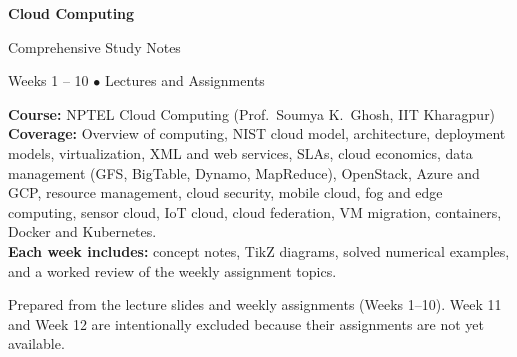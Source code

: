\documentclass[11pt,a4paper,openany]{report}
\begin{document}
\begin{titlepage}
\thispagestyle{empty}
\vspace*{1.5cm}
\begin{tcolorbox}[colback=navy,colframe=slate,boxrule=3pt,arc=3mm,
  left=10mm,right=10mm,top=14mm,bottom=14mm]
{\color{white}\Huge\bfseries Cloud Computing\par}
\vspace{0.5cm}
{\color{white}\LARGE Comprehensive Study Notes\par}
\vspace{0.5cm}
{\color{white}\large Weeks 1 -- 10 \quad $\bullet$ \quad Lectures and Assignments\par}
\end{tcolorbox}
\vspace{3cm}
\begin{tcolorbox}[colback=paleblue,colframe=navy,arc=2mm]
\textbf{Course:} NPTEL Cloud Computing (Prof.\ Soumya K.\ Ghosh, IIT Kharagpur)\\[2pt]
\textbf{Coverage:} Overview of computing, NIST cloud model, architecture, deployment
models, virtualization, XML and web services, SLAs, cloud economics, data management
(GFS, BigTable, Dynamo, MapReduce), OpenStack, Azure and GCP, resource management,
cloud security, mobile cloud, fog and edge computing, sensor cloud, IoT cloud,
cloud federation, VM migration, containers, Docker and Kubernetes.\\[2pt]
\textbf{Each week includes:} concept notes, TikZ diagrams, solved numerical examples,
and a worked review of the weekly assignment topics.
\end{tcolorbox}
\vfill
{\color{slate}\small Prepared from the lecture slides and weekly assignments (Weeks 1--10).
Week 11 and Week 12 are intentionally excluded because their assignments are not yet available.}
\end{titlepage}

\pagestyle{fancy}
\tableofcontents
\clearpage
\end{document}
